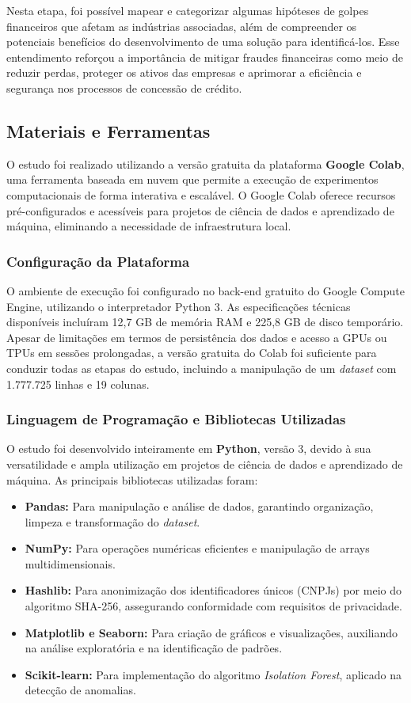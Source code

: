 \documentclass[12pt,a4paper]{article}
\begin{document}
Nesta etapa, foi possível mapear e categorizar algumas hipóteses de golpes financeiros que afetam as indústrias associadas, além de compreender os potenciais benefícios do desenvolvimento de uma solução para identificá-los. Esse entendimento reforçou a importância de mitigar fraudes financeiras como meio de reduzir perdas, proteger os ativos das empresas e aprimorar a eficiência e segurança nos processos de concessão de crédito.


\subsection{Materiais e Ferramentas}

O estudo foi realizado utilizando a versão gratuita da plataforma \textbf{Google Colab}, uma ferramenta baseada em nuvem que permite a execução de experimentos computacionais de forma interativa e escalável. O Google Colab oferece recursos pré-configurados e acessíveis para projetos de ciência de dados e aprendizado de máquina, eliminando a necessidade de infraestrutura local.

\subsubsection{Configuração da Plataforma}
O ambiente de execução foi configurado no back-end gratuito do Google Compute Engine, utilizando o interpretador Python 3. As especificações técnicas disponíveis incluíram 12,7 GB de memória RAM e 225,8 GB de disco temporário. Apesar de limitações em termos de persistência dos dados e acesso a GPUs ou TPUs em sessões prolongadas, a versão gratuita do Colab foi suficiente para conduzir todas as etapas do estudo, incluindo a manipulação de um \textit{dataset} com 1.777.725 linhas e 19 colunas.

\subsubsection{Linguagem de Programação e Bibliotecas Utilizadas}
O estudo foi desenvolvido inteiramente em \textbf{Python}, versão 3, devido à sua versatilidade e ampla utilização em projetos de ciência de dados e aprendizado de máquina. As principais bibliotecas utilizadas foram:

\begin{itemize}
    \item \textbf{Pandas:} Para manipulação e análise de dados, garantindo organização, limpeza e transformação do \textit{dataset}.
    \item \textbf{NumPy:} Para operações numéricas eficientes e manipulação de arrays multidimensionais.
    \item \textbf{Hashlib:} Para anonimização dos identificadores únicos (CNPJs) por meio do algoritmo SHA-256, assegurando conformidade com requisitos de privacidade.
    \item \textbf{Matplotlib e Seaborn:} Para criação de gráficos e visualizações, auxiliando na análise exploratória e na identificação de padrões.
    \item \textbf{Scikit-learn:} Para implementação do algoritmo \textit{Isolation Forest}, aplicado na detecção de anomalias.
\end{itemize}
\end{document}
